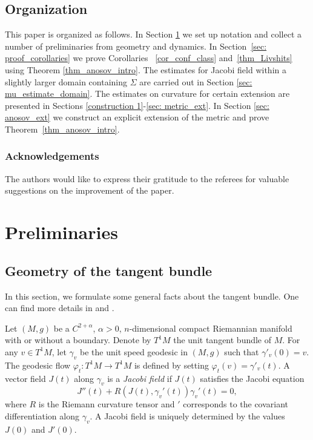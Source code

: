 \documentclass[10pt]{amsart}
\theoremstyle{definition}
\let\phi\varphi
\renewcommand{\>}{{\rangle}}
\newcommand{\<}{{\langle}}
\begin{document}
\subsection{Organization} This paper is organized as follows. In Section \ref{sec: prelim} we set up notation and collect a number of preliminaries from geometry and dynamics. In Section~\ref{sec: proof_corollaries} we prove Corollaries ~\ref{cor_conf_class} and~\ref{thm_Livshits} using Theorem \ref{thm_anosov_intro}. The estimates for Jacobi field within a slightly larger domain containing $\Sigma$ are carried out in Section \ref{sec: mu_estimate_domain}. The estimates on curvature for certain extension are presented in Sections \ref{construction 1}-\ref{sec: metric_ext}. In Section \ref{sec: anosov_ext} we construct an explicit extension of the metric and prove Theorem~\ref{thm_anosov_intro}.

\subsubsection*{Acknowledgements} The authors would like to express their gratitude to the referees for valuable suggestions on the improvement of the paper.

\section{Preliminaries}\label{sec: prelim}

\subsection{Geometry of the tangent bundle}\label{section: geometry tangent bundle}

In this section, we formulate some general facts about the tangent bundle. One can find more details in \cite{E73} and \cite{EO80}.

Let $(M,g)$ be a $C^{2+\alpha}$, $\alpha>0$, $n$-dimensional compact Riemannian manifold with or without a boundary. Denote by $T^1 M$ the unit tangent bundle of $M$. For any $v\in T^1M$, let $\gamma_{v}$ be the unit speed geodesic in $(M,g)$ such that $\gamma'_{v}(0)=v$. The geodesic flow $\phi_t: T^1M\to T^1M$ is defined by setting $\phi_t(v)=\gamma'_{v}(t)$. A vector field $J(t)$ along $\gamma_v$ is a \textit{Jacobi field} if $J(t)$ satisfies the Jacobi equation
\begin{equation}\label{Jacobi_equation}
J''(t)+R({J(t), \gamma_v'(t)})\gamma_v'(t)=0,
\end{equation}
where $R$ is the Riemann curvature tensor and $'$ corresponds to the covariant differentiation along $\gamma_v$. A Jacobi field is uniquely determined by the values $J(0)$ and $J'(0)$.
\end{document}
